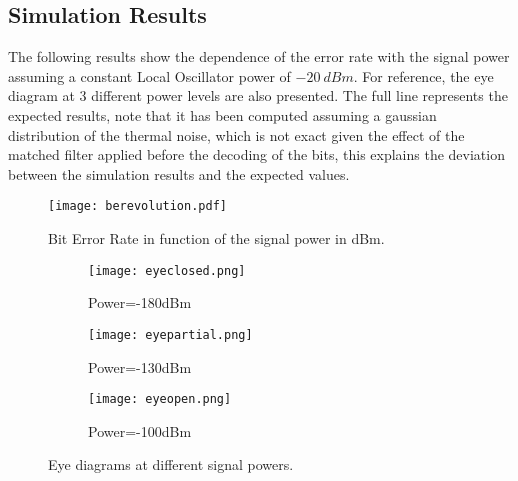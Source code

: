 \subsection*{Simulation Results}

The following results show the dependence of the error rate with the signal power assuming a constant Local Oscillator power of $-20~dBm$. For reference, the eye diagram at 3 different power levels are also presented. The full line represents the expected results, note that it has been computed assuming a gaussian distribution of the thermal noise, which is not exact given the effect of the matched filter applied before the decoding of the bits, this explains the deviation between the simulation results and the expected values.

\begin{figure}[H]
\centering
\texttt{[image: berevolution.pdf]}
\caption{Bit Error Rate in function of the signal power in dBm.}
\label{fig:berevolution}
\end{figure}

\begin{figure}[H]
\centering
\begin{subfigure}{.3\linewidth}
\texttt{[image: eyeclosed.png]}
\caption{Power=-180dBm}
\end{subfigure}
\begin{subfigure}{.3\linewidth}
\texttt{[image: eyepartial.png]}
\caption{Power=-130dBm}
\end{subfigure}
\begin{subfigure}{.3\linewidth}
\texttt{[image: eyeopen.png]}
\caption{Power=-100dBm}
\end{subfigure}
\caption{Eye diagrams at different signal powers.}
\end{figure}


